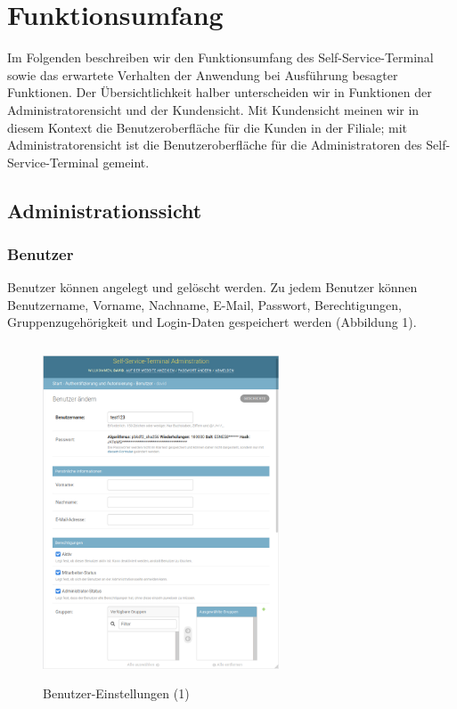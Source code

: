 \section{Funktionsumfang}
Im Folgenden beschreiben wir den Funktionsumfang des Self-Service-Terminal sowie das erwartete Verhalten der Anwendung bei Ausführung besagter Funktionen. Der Übersichtlichkeit halber unterscheiden wir in Funktionen der Administratorensicht und der Kundensicht. Mit Kundensicht meinen wir in diesem Kontext die Benutzeroberfläche für die Kunden in der Filiale; mit Administratorensicht ist die Benutzeroberfläche für die Administratoren des Self-Service-Terminal gemeint.\\

\subsection{Administrationssicht}


\subsubsection{Benutzer} Benutzer können angelegt und gelöscht werden. Zu jedem Benutzer können Benutzername, Vorname, Nachname, E-Mail, Passwort, Berechtigungen, Gruppenzugehörigkeit und Login-Daten gespeichert werden (Abbildung 1).

\begin{figure}[htp]
    \centering
    \includegraphics[width=7cm , height=10cm]{Bilder/AdminBenutzer1.png}
    \caption[Startseite des Self-Service-Terminals]{Benutzer-Einstellungen (1)}
    \label{fig:SSTBenutzer1}
\end{figure}

